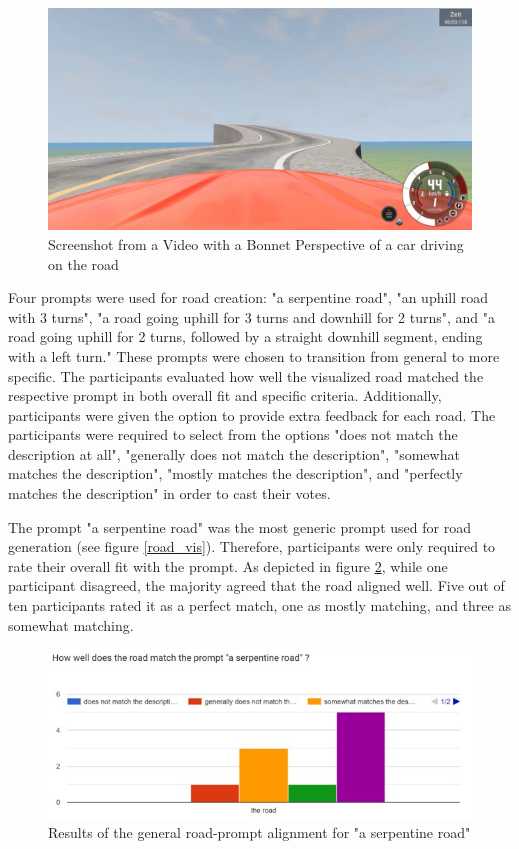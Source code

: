 \begin{figure}[H]
    \centering
    \includegraphics[width=0.5\linewidth]{images/Bonnet_Perspective.jpg}
    \caption{Screenshot from a Video with a Bonnet Perspective of a car driving on the road}
    \label{bonnet-view}
\end{figure}


Four prompts were used for road creation: "a serpentine road", "an uphill road with 3 turns", "a road going uphill for 3 turns and downhill for 2 turns", and "a road going uphill for 2 turns, followed by a straight downhill segment, ending with a left turn." These prompts were chosen to transition from general to more specific. The participants evaluated how well the visualized road matched the respective prompt in both overall fit and specific criteria. Additionally, participants were given the option to provide extra feedback for each road. The participants were required to select from the options "does not match the description at all", "generally does not match the description", "somewhat matches the description", "mostly matches the description", and "perfectly matches the description" in order to cast their votes.

The prompt "a serpentine road" was the most generic prompt used for road generation (see figure \ref{road_vis}). Therefore, participants were only required to rate their overall fit with the prompt. As depicted in figure \ref{serpentine_alignment}, while one participant disagreed, the majority agreed that the road aligned well. Five out of ten participants rated it as a perfect match, one as mostly matching, and three as somewhat matching.

\begin{figure}[H]
    \centering
    \includegraphics[width=0.75\linewidth]{images/serpentine_general.jpg}
    \caption{Results of the general road-prompt alignment for "a serpentine road"}
    \label{serpentine_alignment}
\end{figure}


